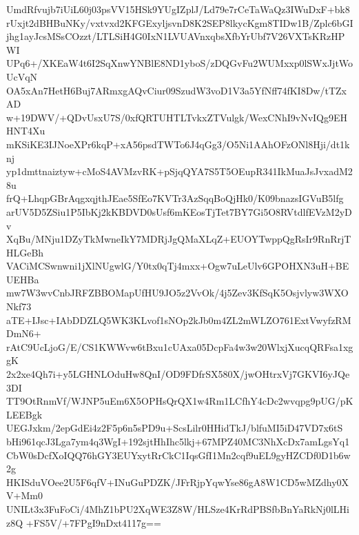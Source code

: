 UmdRfvujb7iUiL60j03psVV15HSk9YUgIZplJ/Ld79e7rCeTaWaQz3IWuDxF+bk8
rUxjt2dBHBuNKy/vxtvxd2KFGExyljsvnD8K2SEP8lkycKgm8TIDw1B/Zplc6bGI
jhg1ayJcsMSsCOzzt/LTLSiH4G0IxN1LVUAVnxqbsXfbYrUbf7V26VXTsKRzHPWI
UPq6+/XKEaW4t6I2SqXnwYNBlE8ND1yboS/zDQGvFu2WUMxxp0lSWxJjtWoUcVqN
OA5xAn7HetH6Buj7ARmxgAQvCiur09SzudW3voD1V3a5YfNff74fKI8Dw/tTZxAD
w+19DWV/+QDvUsxU7S/0xfQRTUHTLTvkxZTVulgk/WexCNhI9vNvIQg9EHHNT4Xu
mKSiKE3IJNoeXPr6kqP+xA56psdTWTo6J4qGg3/O5Ni1AAhOFzONl8Hji/dt1knj
yp1dmttnaiztyw+cMoS4AVMzvRK+pSjqQYA7S5T5OEupR341IkMuaJsJvxadM28u
frQ+LhqpGBrAqgxqjthJEae5SfEo7KVTr3AzSqqBoQjHk0/K09bnazsIGVuB5lfg
arUV5D5ZSiu1P5IbKj2kKBDVD0sUsf6mKEosTjTet7BY7Gi5O8RVtdlfEVzM2yDv
XqBu/MNju1DZyTkMwneIkY7MDRjJgQMaXLqZ+EUOYTwppQgRsIr9RnRrjTHLGeBh
VACiMCSwnwni1jXlNUgwlG/Y0tx0qTj4mxx+Ogw7uLeUlv6GPOHXN3uH+BEUEHBa
mw7W3wvCnbJRFZBBOMapUfHU9JO5z2VvOk/4j5Zev3KfSqK5Osjvlyw3WXONkf73
aTE+IJsc+IAbDDZLQ5WK3KLvof1sNOp2kJb0m4ZL2mWLZO761ExtVwyfzRMDmN6+
rAtC9UcLjoG/E/CS1KWWvw6tBxu1cUAxa05DcpFa4w3w20WlxjXucqQRFsa1xggK
2x2xe4Qh7i+y5LGHNLOduHw8QnI/OD9FDfrSX580X/jwOHtrxVj7GKVI6yJQe3DI
TT9OtRnmVf/WJNP5uEm6X5OPHsQrQX1w4Rm1LCfhY4cDc2wvqpg9pUG/pKLEEBgk
UEGJxkm/2epGdEi4z2F5p6n5sPD9u+ScsLilr0HHidTkJ/blfuMI5iD47VD7x6tS
bHi961qcJ3Lga7ym4q3WgI+192sjtHhIhc5lkj+67MPZ40MC3NhXcDx7amLgsYq1
CbW0sDcfXoIQQ76hGY3EUYxytRrCkC1IqsGfI1Mn2cqf9uEL9gyHZCDf0D1b6w2g
HKISduVOee2U5F6qfV+INuGuPDZK/JFrRjpYqwYse86gA8W1CD5wMZdhy0XV+Mm0
UNILt3x3FuFoCi/4MhZ1bPU2XqWE3Z8W/HLSze4KrRdPBSfbBnYaRkNj0lLHiz8Q
+FS5V/+7FPgI9nDxt4117g==
